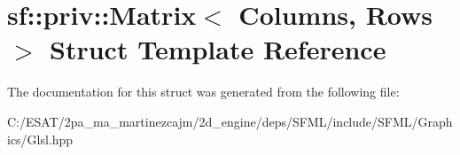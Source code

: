 \hypertarget{structsf_1_1priv_1_1_matrix}{}\section{sf\+:\+:priv\+:\+:Matrix$<$ Columns, Rows $>$ Struct Template Reference}
\label{structsf_1_1priv_1_1_matrix}


The documentation for this struct was generated from the following file\+:\begin{DoxyCompactItemize}
\item 
C\+:/\+E\+S\+A\+T/2pa\+\_\+ma\+\_\+martinezcajm/2d\+\_\+engine/deps/\+S\+F\+M\+L/include/\+S\+F\+M\+L/\+Graphics/Glsl.\+hpp\end{DoxyCompactItemize}
